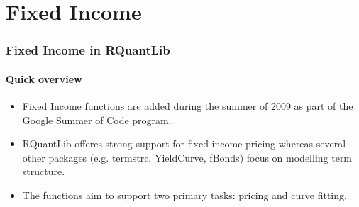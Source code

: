 \documentclass[compress]{beamer}
\begin{document}
%
%
%
%
%
%

\section{Fixed Income}
\begin{frame}
	\frametitle{Fixed Income in RQuantLib}
	\framesubtitle{Quick overview}
	\begin{itemize}
		\item Fixed Income functions are added during the summer of 2009 as part of the Google Summer of 	Code program. 
		\item  RQuantLib offeres strong support for fixed income pricing whereas several other packages (e.g. termstrc, YieldCurve, fBonds) focus on modelling term structure.		
		\item The functions aim to support two primary tasks: pricing and curve fitting. 		
	\end{itemize}
\end{frame}
\end{document}
